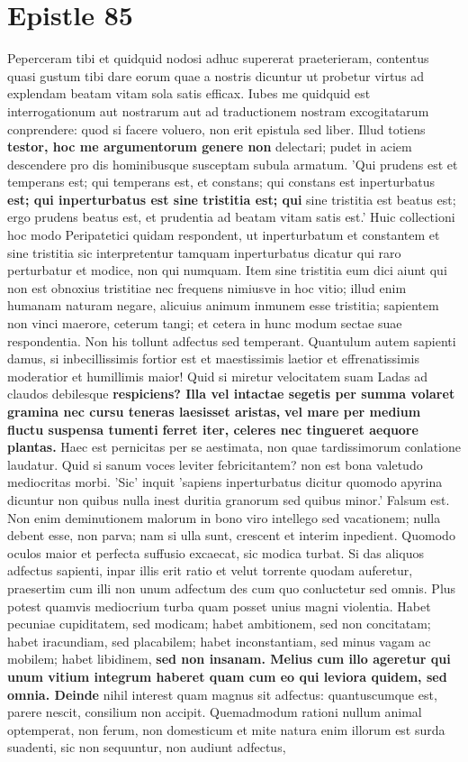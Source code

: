 \section{Epistle 85} Peperceram tibi et quidquid nodosi adhuc supererat praeterieram, contentus quasi gustum tibi dare eorum quae a nostris dicuntur ut probetur virtus ad explendam beatam vitam sola satis efficax. Iubes me quidquid est interrogationum aut nostrarum aut ad traductionem nostram excogitatarum conprendere: quod si facere voluero, non erit epistula sed liber. Illud totiens \textbf{testor, hoc me argumentorum genere non} delectari; pudet in aciem descendere pro dis hominibusque susceptam subula armatum. 'Qui prudens est et temperans est; qui temperans est, et constans; qui constans est inperturbatus \textbf{est; \textbf{qui inperturbatus est sine tristitia est; qui}} sine tristitia est beatus est; ergo prudens beatus est, et prudentia ad beatam vitam satis est.' Huic collectioni hoc modo Peripatetici quidam respondent, ut inperturbatum et constantem et sine tristitia sic interpretentur tamquam inperturbatus dicatur qui raro perturbatur et modice, non qui numquam. Item sine tristitia eum dici aiunt qui non est obnoxius tristitiae nec frequens nimiusve in hoc vitio; illud enim humanam naturam negare, alicuius animum inmunem esse tristitia; sapientem non vinci maerore, ceterum tangi; et cetera in hunc modum sectae suae respondentia. Non his tollunt adfectus sed temperant. Quantulum autem sapienti damus, si inbecillissimis fortior est et maestissimis laetior et effrenatissimis moderatior et humillimis maior! Quid si miretur velocitatem suam Ladas ad claudos debilesque \textbf{respiciens? \textbf{Illa vel intactae segetis per} summa volaret} \textbf{gramina nec cursu teneras laesisset aristas,} \textbf{vel \textbf{mare per medium fluctu suspensa tumenti}} \textbf{ferret iter, celeres nec tingueret aequore plantas.} Haec est pernicitas per se aestimata, non quae tardissimorum conlatione laudatur. Quid si sanum voces leviter febricitantem? non est bona valetudo mediocritas morbi. 'Sic' inquit 'sapiens inperturbatus dicitur quomodo apyrina dicuntur non quibus nulla inest duritia granorum sed quibus minor.' Falsum est. Non enim deminutionem malorum in bono viro intellego sed vacationem; nulla debent esse, non parva; nam si ulla sunt, crescent et interim inpedient. Quomodo oculos maior et perfecta suffusio excaecat, sic modica turbat. Si das aliquos adfectus sapienti, inpar illis erit ratio et velut torrente quodam auferetur, praesertim cum illi non unum adfectum des cum quo conluctetur sed omnis. Plus potest quamvis mediocrium turba quam posset unius magni violentia. Habet pecuniae cupiditatem, sed modicam; habet ambitionem, sed non concitatam; habet iracundiam, sed placabilem; habet inconstantiam, sed minus vagam ac mobilem; habet libidinem, \textbf{sed non insanam. Melius \textbf{cum \textbf{illo ageretur} \textbf{qui unum vitium integrum haberet}} quam cum \textbf{eo qui} leviora quidem, sed omnia. Deinde} nihil interest quam magnus sit adfectus: quantuscumque est, parere nescit, consilium non accipit. Quemadmodum rationi nullum animal optemperat, non ferum, non domesticum et mite natura enim illorum est surda suadenti, sic non sequuntur, non audiunt adfectus, 